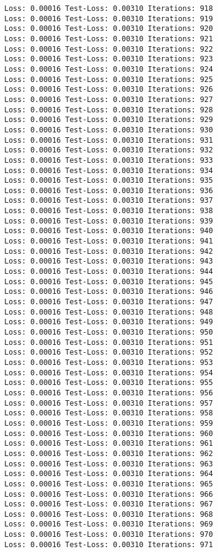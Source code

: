 \documentclass[11pt]{article}
\begin{document}
\begin{Verbatim}[commandchars=\\\{\}]
Loss: 0.00016 Test-Loss: 0.00310 Iterations: 918
Loss: 0.00016 Test-Loss: 0.00310 Iterations: 919
Loss: 0.00016 Test-Loss: 0.00310 Iterations: 920
Loss: 0.00016 Test-Loss: 0.00310 Iterations: 921
Loss: 0.00016 Test-Loss: 0.00310 Iterations: 922
Loss: 0.00016 Test-Loss: 0.00310 Iterations: 923
Loss: 0.00016 Test-Loss: 0.00310 Iterations: 924
Loss: 0.00016 Test-Loss: 0.00310 Iterations: 925
Loss: 0.00016 Test-Loss: 0.00310 Iterations: 926
Loss: 0.00016 Test-Loss: 0.00310 Iterations: 927
Loss: 0.00016 Test-Loss: 0.00310 Iterations: 928
Loss: 0.00016 Test-Loss: 0.00310 Iterations: 929
Loss: 0.00016 Test-Loss: 0.00310 Iterations: 930
Loss: 0.00016 Test-Loss: 0.00310 Iterations: 931
Loss: 0.00016 Test-Loss: 0.00310 Iterations: 932
Loss: 0.00016 Test-Loss: 0.00310 Iterations: 933
Loss: 0.00016 Test-Loss: 0.00310 Iterations: 934
Loss: 0.00016 Test-Loss: 0.00310 Iterations: 935
Loss: 0.00016 Test-Loss: 0.00310 Iterations: 936
Loss: 0.00016 Test-Loss: 0.00310 Iterations: 937
Loss: 0.00016 Test-Loss: 0.00310 Iterations: 938
Loss: 0.00016 Test-Loss: 0.00310 Iterations: 939
Loss: 0.00016 Test-Loss: 0.00310 Iterations: 940
Loss: 0.00016 Test-Loss: 0.00310 Iterations: 941
Loss: 0.00016 Test-Loss: 0.00310 Iterations: 942
Loss: 0.00016 Test-Loss: 0.00310 Iterations: 943
Loss: 0.00016 Test-Loss: 0.00310 Iterations: 944
Loss: 0.00016 Test-Loss: 0.00310 Iterations: 945
Loss: 0.00016 Test-Loss: 0.00310 Iterations: 946
Loss: 0.00016 Test-Loss: 0.00310 Iterations: 947
Loss: 0.00016 Test-Loss: 0.00310 Iterations: 948
Loss: 0.00016 Test-Loss: 0.00310 Iterations: 949
Loss: 0.00016 Test-Loss: 0.00310 Iterations: 950
Loss: 0.00016 Test-Loss: 0.00310 Iterations: 951
Loss: 0.00016 Test-Loss: 0.00310 Iterations: 952
Loss: 0.00016 Test-Loss: 0.00310 Iterations: 953
Loss: 0.00016 Test-Loss: 0.00310 Iterations: 954
Loss: 0.00016 Test-Loss: 0.00310 Iterations: 955
Loss: 0.00016 Test-Loss: 0.00310 Iterations: 956
Loss: 0.00016 Test-Loss: 0.00310 Iterations: 957
Loss: 0.00016 Test-Loss: 0.00310 Iterations: 958
Loss: 0.00016 Test-Loss: 0.00310 Iterations: 959
Loss: 0.00016 Test-Loss: 0.00310 Iterations: 960
Loss: 0.00016 Test-Loss: 0.00310 Iterations: 961
Loss: 0.00016 Test-Loss: 0.00310 Iterations: 962
Loss: 0.00016 Test-Loss: 0.00310 Iterations: 963
Loss: 0.00016 Test-Loss: 0.00310 Iterations: 964
Loss: 0.00016 Test-Loss: 0.00310 Iterations: 965
Loss: 0.00016 Test-Loss: 0.00310 Iterations: 966
Loss: 0.00016 Test-Loss: 0.00310 Iterations: 967
Loss: 0.00016 Test-Loss: 0.00310 Iterations: 968
Loss: 0.00016 Test-Loss: 0.00310 Iterations: 969
Loss: 0.00016 Test-Loss: 0.00310 Iterations: 970
Loss: 0.00016 Test-Loss: 0.00310 Iterations: 971

\end{Verbatim}
\end{document}
